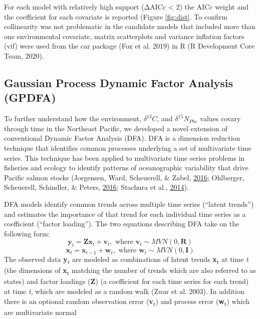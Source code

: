 \documentclass [11pt, proquest] {uwthesis}[2015/03/03]
\begin{document}
For each model with relatively high support (ΔAICc \textless{} 2) the
AICc weight and the coefficient for each covariate is reported (Figure
\ref{fig:dist}. To confirm collinearity was not problematic in the
candidate models that included more than one environmental covariate,
matrix scatterplots and variance inflation factors (vif) were used from
the car package (Fox et al. 2019) in R (R Development Core Team, 2020).

\subsection{Gaussian Process Dynamic Factor Analysis
(GPDFA)}\label{gaussian-process-dynamic-factor-analysis-gpdfa}

To further understand how the environment, \(\delta^{13}C\), and
\(\delta^{15}N_{Phe}\) values covary through time in the Northeast
Pacific, we developed a novel extension of conventional Dynamic Factor
Analysis (DFA). DFA is a dimension reduction technique that identifies
common processes underlying a set of multivariate time series. This
technique has been applied to multivariate time series problems in
fisheries and ecology to identify patterns of oceanographic variability
that drive Pacific salmon stocks (Jorgensen, Ward, Scheuerell, \& Zabel,
\protect\hyperlink{ref-Jorgensen2016}{2016}; Ohlberger, Scheuerell,
Schindler, \& Peters, \protect\hyperlink{ref-Ohlberger2016}{2016};
Stachura et al., \protect\hyperlink{ref-Stachura2014}{2014}).

DFA models identify common trends across multiple time series (``latent
trends'') and estimates the importance of that trend for each individual
time series as a coefficient (``factor loading''). The two equations
describing DFA take on the following form:
\begin{equation} 
 \boldsymbol{y}_t = \boldsymbol{Zx}_t + \boldsymbol{v}_t,\mbox{ where }\boldsymbol{v}_t \sim MVN(0,\boldsymbol{R})
  \label{eq:gdfa1}
\end{equation}
\begin{equation} 
 \boldsymbol{x}_t = \boldsymbol{x}_{t-1} + \boldsymbol{w}_t,\mbox{ where }\boldsymbol{w}_t \sim MVN(0,\boldsymbol{I})
  \label{eq:gdfa2}
\end{equation}
The observed data \textbf{y}\textsubscript{t} are modeled as
combinations of latent trends \textbf{x}\textsubscript{t} at time
\emph{t} (the dimensions of \textbf{x}\textsubscript{t} matching the
number of trends which are also referred to as states) and factor
loadings (\textbf{Z}) (a coefficient for each time series for each
trend) at time \emph{t}, which are modeled as a random walk (Zuur et al.
2003). In addition there is an optional random observation error
(\textbf{v}\textsubscript{t}) and process error
(\textbf{w}\textsubscript{t}) which are multivariate normal
\end{document}
